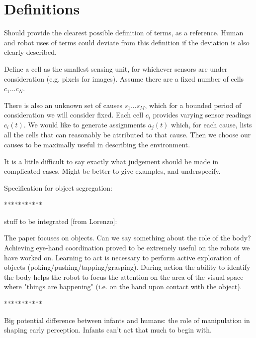 \cite{kirkham02visual}
\cite{johnson03building}

\section{Definitions}

Should provide the clearest possible definition of terms,
as a reference.  Human and robot uses of terms could deviate
from this definition if the deviation is also clearly described.

Define a cell as the smallest sensing unit, for whichever sensors are
under consideration (e.g. pixels for images).  Assume there are a
fixed number of cells $c_1...c_{N}$.

There is also an unknown set of causes $s_1...s_{M}$, which for a
bounded period of consideration we will consider fixed.  Each cell
$c_i$ provides varying sensor readings $c_i(t)$.  We would like to
generate assignments $a_j(t)$ which, for each cause, lists all the
cells that can reasonably be attributed to that cause.  Then we choose
our causes to be maximally useful in describing the environment.

It is a little difficult to say exactly what judgement should be
made in complicated cases.  Might be better to give examples,
and underspecify.

Specification for object segregation:

***********

stuff to be integrated [from Lorenzo]:


The paper focuses on objects. Can we say something about the role of the
body? Achieving eye-hand coordination proved to be extremely useful on the
robots we have worked on. Learning to act is necessary to perform active
exploration of objects (poking/pushing/tapping/grasping). During action the
ability to identify the body helps the robot to focus the attention on the
area of the visual space where "things are happening" (i.e. on the hand upon
contact with the object).


***********

Big potential difference between infants and humans: the role
of manipulation in shaping early perception.  Infants can't
act that much to begin with.



